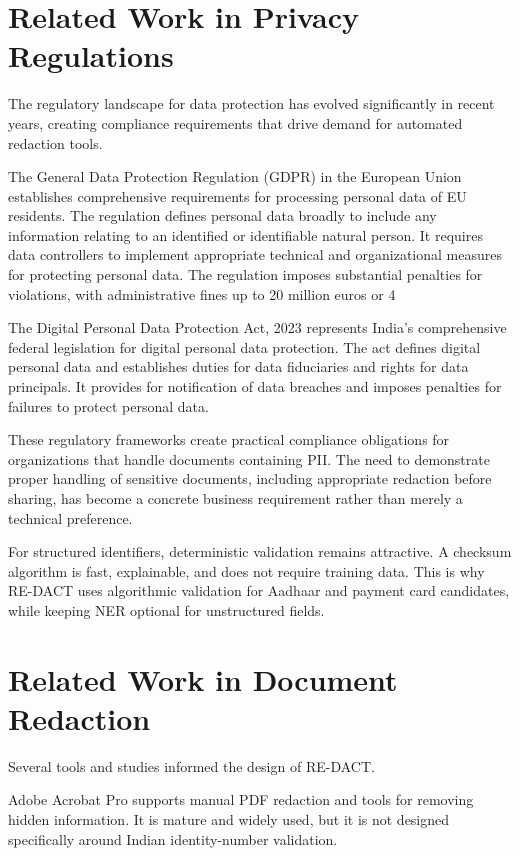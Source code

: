 \section{Related Work in Privacy Regulations}

The regulatory landscape for data protection has evolved significantly in recent years, creating compliance requirements that drive demand for automated redaction tools.

The General Data Protection Regulation (GDPR) in the European Union establishes comprehensive requirements for processing personal data of EU residents. The regulation defines personal data broadly to include any information relating to an identified or identifiable natural person. It requires data controllers to implement appropriate technical and organizational measures for protecting personal data. The regulation imposes substantial penalties for violations, with administrative fines up to 20 million euros or 4%

The Digital Personal Data Protection Act, 2023 represents India's comprehensive federal legislation for digital personal data protection. The act defines digital personal data and establishes duties for data fiduciaries and rights for data principals. It provides for notification of data breaches and imposes penalties for failures to protect personal data.

These regulatory frameworks create practical compliance obligations for organizations that handle documents containing PII. The need to demonstrate proper handling of sensitive documents, including appropriate redaction before sharing, has become a concrete business requirement rather than merely a technical preference.

For structured identifiers, deterministic validation remains attractive. A checksum algorithm is fast, explainable, and does not require training data. This is why RE-DACT uses algorithmic validation for Aadhaar and payment card candidates, while keeping NER optional for unstructured fields.

\section{Related Work in Document Redaction}

Several tools and studies informed the design of RE-DACT.

Adobe Acrobat Pro supports manual PDF redaction and tools for removing hidden information. It is mature and widely used, but it is not designed specifically around Indian identity-number validation.

